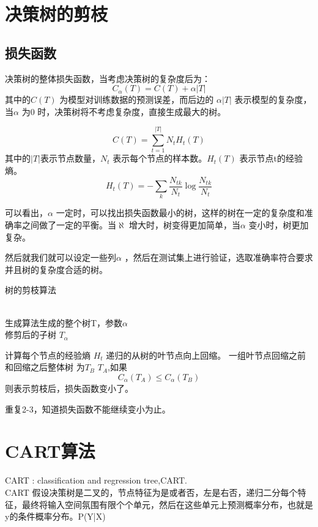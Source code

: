 \documentclass[UTF8]{ctexart}
\begin{document}
    

\section{决策树的剪枝}
\subsection{损失函数}
\noindent 决策树的整体损失函数，当考虑决策树的复杂度后为：
$$
C_\alpha(T) = C(T) + \alpha |T| 
$$
其中的$C(T)$ 为模型对训练数据的预测误差，而后边的  $\alpha |T| $ 表示模型的复杂度，当$\alpha$ 为0 时，决策树将不考虑复杂度，直接生成最大的树。

$$
 C(T) = \sum_{t=1}^{|T|} N_t H_t(T) 
$$
其中的$|T| $表示节点数量，$N_t$ 表示每个节点的样本数。$H_t(T) $ 表示节点t的经验熵。
$$
H_t(T)  = - \sum_{k} \frac{N_{tk}}{N_t} \log \frac{N_{tk}}{N_t}
$$



可以看出，$\alpha$ 一定时，可以找出损失函数最小的树，这样的树在一定的复杂度和准确率之间做了一定的平衡。当$\aleph$ 增大时，树变得更加简单，当$\alpha$ 变小时，树更加复杂。

然后就我们就可以设定一些列$\alpha$ ，然后在测试集上进行验证，选取准确率符合要求并且树的复杂度合适的树。

\begin{algorithm}[htb]
	\begin{algorithmic}[1]
		\caption{树的剪枝算法}
		\REQUIRE ~~ \\生成算法生成的整个树T，参数$\alpha$
		\ENSURE ~~ \\修剪后的子树 $T_\alpha$
		
		\STATE 
		计算每个节点的经验熵 $H_t$
		\STATE 
		递归的从树的叶节点向上回缩。
		\STATE 
		一组叶节点回缩之前和回缩之后整体树 为$T_B$  $T_A$,如果 
		$$
		C_\alpha(T_A) \le C_\alpha(T_B) 
		$$ 
		则表示剪枝后，损失函数变小了。
		
		\STATE 
		重复2-3，知道损失函数不能继续变小为止。
	\end{algorithmic}
\end{algorithm}

\section{CART算法}
\noindent CART : classification and regression tree,CART.\\

CART 假设决策树是二叉的，节点特征为是或者否，左是右否，递归二分每个特征，最终将输入空间氛围有限个个单元，然后在这些单元上预测概率分布，也就是y的条件概率分布。P(Y|X) \\
\end{document}
